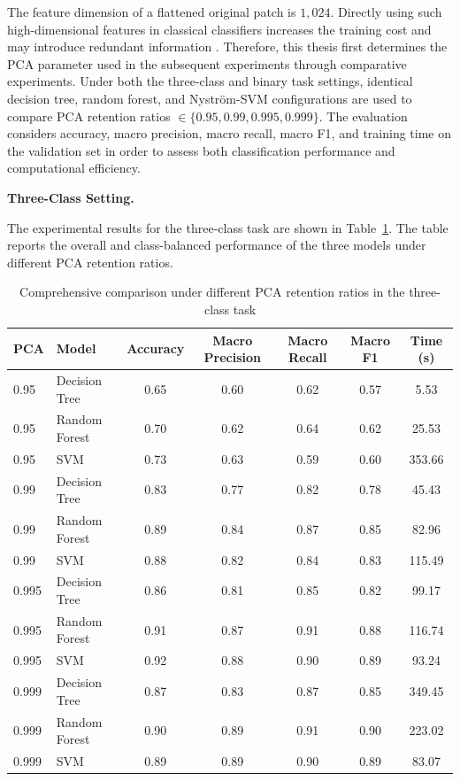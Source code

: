 \par The feature dimension of a flattened original patch is $1,024$. Directly
using such high-dimensional features in classical classifiers increases the
training cost and may introduce redundant information
\cite{zheng2021application}. Therefore, this thesis first
determines the PCA parameter used in the subsequent experiments through
comparative experiments. Under both the three-class and binary task settings,
identical decision tree, random forest, and Nystr\"{o}m-SVM configurations are
used to compare PCA retention ratios
\(\in\{0.95,0.99,0.995,0.999\}\). The evaluation considers accuracy, macro
precision, macro recall, macro F1, and training time on the validation set in
order to assess both classification performance and computational efficiency.

\par\medskip \noindent\textbf{Three-Class Setting.}
\par The experimental results for the three-class task are shown in
Table~\ref{tab:pca-triclass-pca}. The table reports the overall and
class-balanced performance of the three models under different PCA retention
ratios.

\begin{table}[htbp]
    \centering
    \caption{Comprehensive comparison under different PCA retention ratios in the three-class task}
    \label{tab:pca-triclass-pca}
    \begin{tabular}{llccccc}
        \toprule
        PCA & Model & Accuracy & Macro Precision &
        Macro Recall & Macro F1 & Time (s) \\
        \midrule
        0.95  & Decision Tree & 0.65 & 0.60 & 0.62 & 0.57 & 5.53   \\
        0.95  & Random Forest & 0.70 & 0.62 & 0.64 & 0.62 & 25.53  \\
        0.95  & SVM           & 0.73 & 0.63 & 0.59 & 0.60 & 353.66 \\
        0.99  & Decision Tree & 0.83 & 0.77 & 0.82 & 0.78 & 45.43  \\
        0.99  & Random Forest & 0.89 & 0.84 & 0.87 & 0.85 & 82.96  \\
        0.99  & SVM           & 0.88 & 0.82 & 0.84 & 0.83 & 115.49 \\
        0.995 & Decision Tree & 0.86 & 0.81 & 0.85 & 0.82 & 99.17  \\
        0.995 & Random Forest & 0.91 & 0.87 & 0.91 & 0.88 & 116.74 \\
        0.995 & SVM           & 0.92 & 0.88 & 0.90 & 0.89 & 93.24  \\
        0.999 & Decision Tree & 0.87 & 0.83 & 0.87 & 0.85 & 349.45 \\
        0.999 & Random Forest & 0.90 & 0.89 & 0.91 & 0.90 & 223.02 \\
        0.999 & SVM           & 0.89 & 0.89 & 0.90 & 0.89 & 83.07  \\
        \bottomrule
    \end{tabular}
\end{table}

